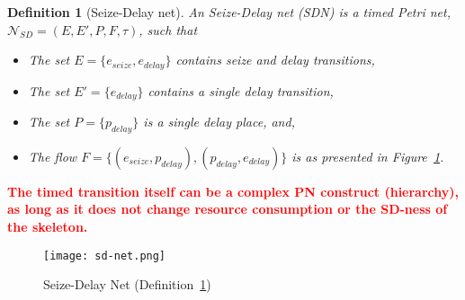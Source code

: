\documentclass[11pt]{article}
\newcommand{\todo}[1]{\textcolor{red}{\bf {#1}}}
\newtheorem{mydef}{Definition}
\begin{document}
\begin{mydef} [Seize-Delay net] \label{def:sdnet}
	An Seize-Delay net (SDN) is a timed Petri net, 
	$\mathcal{N}_{SD}= (E, E' , P , F, \tau)$, such that 
	\begin{itemize}
		\item The set $E = \{ e_{seize}, e_{delay} \}$ contains seize and delay transitions, 
		\item The set $E' = \{e_{delay}\}$ contains a single delay transition, 
		\item The set $P = \{p_{delay}\}$ is a single delay place, and,
		\item The flow $F = \{ (e_{seize}, p_{delay}), (p_{delay}, e_{delay})\}$ is as presented in Figure~\ref{fig:sd-net}.
	\end{itemize}
\end{mydef} 
\todo{The timed transition itself can be a complex PN construct (hierarchy), as long as it does not
	change resource consumption or the SD-ness of the skeleton.}

\begin{figure}[t!]
	\centering
	\texttt{[image: sd-net.png]}
	\caption{Seize-Delay Net (Definition~\ref{def:sdnet})}
	\label{fig:sd-net}  
\end{figure}
\end{document}
